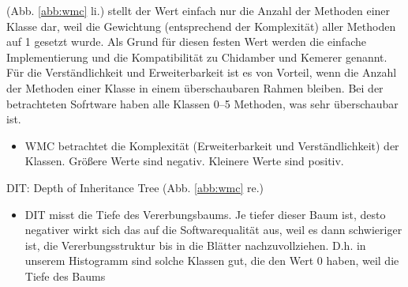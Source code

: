 \documentclass{scrreprt}
\begin{document}
\begin{description}


\item [WMC: Weighted methods per class] (Abb. \ref{abb:wmc} li.) stellt der Wert einfach nur die Anzahl der Methoden einer Klasse dar, weil die Gewichtung (entsprechend der Komplexität) aller Methoden auf 1 gesetzt wurde. Als Grund für diesen festen Wert werden die einfache Implementierung und die Kompatibilität zu Chidamber und Kemerer genannt. Für die Verständlichkeit und Erweiterbarkeit ist es von Vorteil, wenn die Anzahl der Methoden einer Klasse in einem überschaubaren Rahmen bleiben. Bei der betrachteten Sofrtware haben alle Klassen 0–5 Methoden, was sehr überschaubar ist.  
    \begin{itemize}
    \item WMC betrachtet die Komplexität (Erweiterbarkeit und Verständlichkeit) der Klassen. Größere Werte sind negativ. Kleinere Werte sind positiv.
    \end{itemize}
    
    


\item DIT: Depth of Inheritance Tree (Abb. \ref{abb:wmc} re.)
    \begin{itemize}
    \item DIT misst die Tiefe des Vererbungsbaums. Je tiefer dieser Baum ist, desto negativer wirkt sich das auf die Softwarequalität aus, weil es dann schwieriger ist, die Vererbungsstruktur bis in die Blätter nachzuvollziehen. D.h. in unserem Histogramm sind solche Klassen gut, die den Wert 0 haben, weil die Tiefe des Baums
    \end{itemize}


\end{description}
\end{document}
